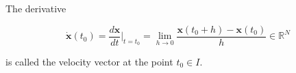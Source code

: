 The derivative

$$\dot{\mathbf{x}}(t_0) = \frac{d\mathbf{x}}{dt} \bigg|_{t=t_0} = \lim_{h \to 0} \frac{\mathbf{x}(t_0 + h) - \mathbf{x}(t_0)}{h} \in \mathbb{R}^N$$

is called the velocity vector at the point $t_0 \in I$.
